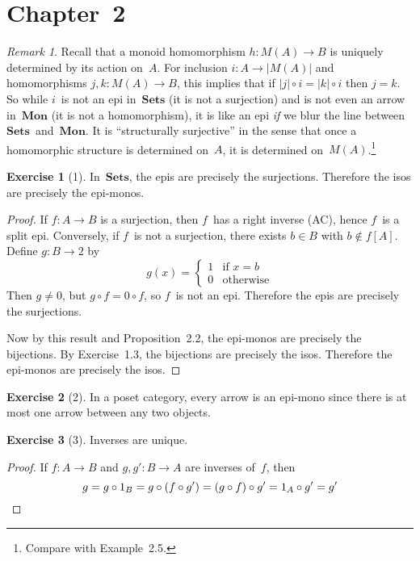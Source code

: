 \documentclass[letterpaper,12pt]{article}
\newcommand{\after}{\circ}
\newcommand{\cat}[1]{\mathbf{#1}}
\newcommand{\under}[1]{|{#1}|}
\newcommand{\2}{\cat{2}}
\newcommand{\Sets}{\cat{Sets}}
\newcommand{\Mon}{\cat{Mon}}
\theoremstyle{definition}
\newtheorem*{exer}{Exercise}
\theoremstyle{remark}
\newtheorem*{rmk}{Remark}
\theoremstyle{direction}
\begin{document}
\section*{Chapter~2}
\begin{rmk}
Recall that a monoid homomorphism \(h:M(A)\to B\) is uniquely determined by its action on~\(A\). For inclusion \(i:A\to\under{M(A)}\) and homomorphisms \(j,k:M(A)\to B\), this implies that if \(\under{j}\after i=\under{k}\after i\) then \(j=k\). So while \(i\)~is not an epi in~\(\Sets\) (it is not a surjection) and is not even an arrow in~\(\Mon\) (it is not a homomorphism), it is like an epi \emph{if} we blur the line between \(\Sets\)~and~\(\Mon\). It is ``structurally surjective'' in the sense that once a homomorphic structure is determined on~\(A\), it is determined on~\(M(A)\).\footnote{Compare with Example~2.5.}
\end{rmk}

\begin{exer}[1]
In~\(\Sets\), the epis are precisely the surjections. Therefore the isos are precisely the epi-monos.
\end{exer}
\begin{proof}
If \(f:A\to B\) is a surjection, then \(f\)~has a right inverse (AC), hence \(f\)~is a split epi. Conversely, if \(f\)~is not a surjection, there exists \(b\in B\) with \(b\not\in f[A]\). Define \(g:B\to 2\) by
\[g(x)=\begin{cases}
1&\text{if }x=b\\
0&\text{otherwise}
\end{cases}\]
Then \(g\ne0\), but \(g\after f=0\after f\), so \(f\)~is not an epi. Therefore the epis are precisely the surjections.

Now by this result and Proposition~2.2, the epi-monos are precisely the bijections. By Exercise~1.3, the bijections are precisely the isos. Therefore the epi-monos are precisely the isos.
\end{proof}

\begin{exer}[2]
In a poset category, every arrow is an epi-mono since there is at most one arrow between any two objects.
\end{exer}

\begin{exer}[3]
Inverses are unique.
\end{exer}
\begin{proof}
If \(f:A\to B\) and \(g,g':B\to A\) are inverses of~\(f\), then
\[g=g\after 1_B=g\after(f\after g')=(g\after f)\after g'=1_A\after g'=g'\qedhere\]
\end{proof}
\end{document}
